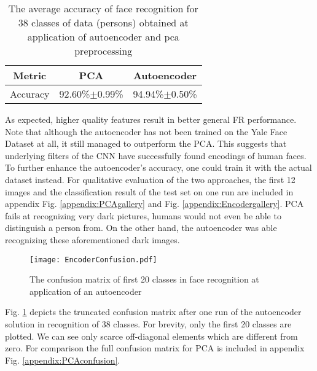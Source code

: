 \begin{table}[h]
  \caption{The average accuracy of face recognition for 38 classes of data (persons) obtained at application of autoencoder and pca preprocessing}
  \begin{center}
  \begin{tabular}{|c|c|c|}
  \hline
  \textbf{Metric} & \textbf{PCA} & \textbf{Autoencoder} \\
  \hline
  Accuracy & 92.60\%$\pm$0.99\% & 94.94\%$\pm$0.50\%\\
  \hline
  \end{tabular}
  \label{scores}
  \end{center}
\end{table}

As expected, higher quality features result in better general FR performance.
Note that although the autoencoder has not been trained on the Yale Face Dataset
at all, it still managed to outperform the PCA. This suggests that underlying
filters of the CNN have successfully found encodings of human faces. To further
enhance the autoencoder's accuracy, one could train it with the actual dataset
instead. For qualitative evaluation of the two approaches, the first 12 images
and the classification result of the test set on one run are included in
appendix Fig. \ref{appendix:PCAgallery} and Fig. \ref{appendix:Encodergallery}.
PCA fails at recognizing very dark pictures, humans would not even be able to
distinguish a person from. On the other hand, the autoencoder was able
recognizing these aforementioned dark images.

\begin{figure}[h]
  \centering
  \texttt{[image: EncoderConfusion.pdf]}
  \caption{The confusion matrix of first 20 classes in face recognition at application of an autoencoder}
  \label{confusion}
\end{figure}

Fig. \ref{confusion} depicts the truncated confusion matrix after one run of the
autoencoder solution in recognition of 38 classes. For brevity, only the first
20 classes are plotted. We can see only scarce off-diagonal elements which are
different from zero. For comparison the full confusion matrix for PCA is
included in appendix Fig. \ref{appendix:PCAconfusion}.
